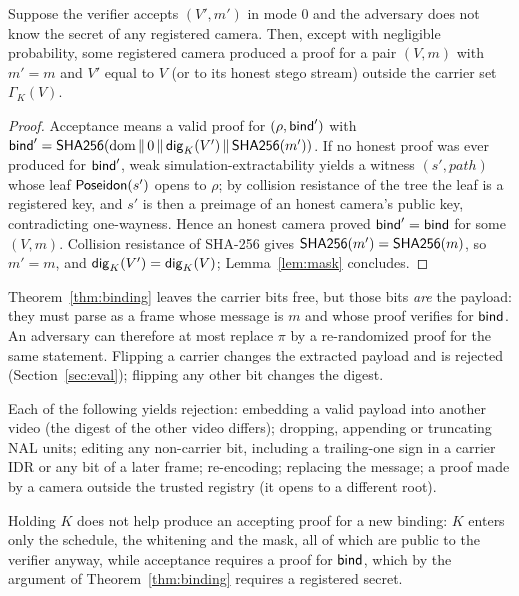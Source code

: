 \begin{theorem}[Binding, G2]
\label{thm:binding}
Suppose the verifier accepts $(V',m')$ in mode 0 and the adversary does not know the secret of any registered camera. Then, except with negligible probability, some registered camera produced a proof for a pair $(V,m)$ with $m'=m$ and $V'$ equal to $V$ (or to its honest stego stream) outside the carrier set $\Gamma_K(V)$.
\end{theorem}
\begin{proof}
Acceptance means a valid proof for $(\rho,\mathsf{bind}')$ with $\mathsf{bind}'=\mathsf{SHA256}(\text{dom}\,\|\,0\,\|\,\mathsf{dig}_K(V')\,\|\,\mathsf{SHA256}(m'))$. If no honest proof was ever produced for $\mathsf{bind}'$, weak simulation-extractability yields a witness $(s',\mathit{path})$ whose leaf $\mathsf{Poseidon}(s')$ opens to $\rho$; by collision resistance of the tree the leaf is a registered key, and $s'$ is then a preimage of an honest camera's public key, contradicting one-wayness. Hence an honest camera proved $\mathsf{bind}'=\mathsf{bind}$ for some $(V,m)$. Collision resistance of SHA-256 gives $\mathsf{SHA256}(m')=\mathsf{SHA256}(m)$, so $m'=m$, and $\mathsf{dig}_K(V')=\mathsf{dig}_K(V)$; Lemma~\ref{lem:mask} concludes.
\end{proof}

\begin{remark}
Theorem~\ref{thm:binding} leaves the carrier bits free, but those bits \emph{are} the payload: they must parse as a frame whose message is $m$ and whose proof verifies for $\mathsf{bind}$. An adversary can therefore at most replace $\pi$ by a re-randomized proof for the same statement. Flipping a carrier changes the extracted payload and is rejected (Section~\ref{sec:eval}); flipping any other bit changes the digest.
\end{remark}

\begin{corollary}
Each of the following yields rejection: embedding a valid payload into another video (the digest of the other video differs); dropping, appending or truncating NAL units; editing any non-carrier bit, including a trailing-one sign in a carrier IDR or any bit of a later frame; re-encoding; replacing the message; a proof made by a camera outside the trusted registry (it opens to a different root).
\end{corollary}

\begin{proposition}
Holding $K$ does not help produce an accepting proof for a new binding: $K$ enters only the schedule, the whitening and the mask, all of which are public to the verifier anyway, while acceptance requires a proof for $\mathsf{bind}$, which by the argument of Theorem~\ref{thm:binding} requires a registered secret.
\end{proposition}

